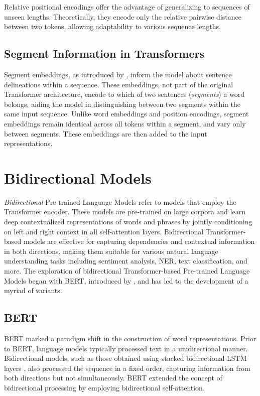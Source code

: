 Relative positional encodings offer the advantage of generalizing to sequences of unseen lengths. Theoretically, they encode only the relative pairwise distance between two tokens, allowing adaptability to various sequence lengths.

\subsection{Segment Information in Transformers}

Segment embeddings, as introduced by \citet{devlin2018bert}, inform the model about sentence delineations within a sequence. These embeddings, not part of the original Transformer architecture, encode to which of two sentences (\textit{segments})
a word belongs, aiding the model in distinguishing between two segments within the same input sequence. 
Unlike word embeddings and position encodings, segment embeddings remain identical across all tokens within a segment, and vary only between segments. These embeddings are then added to the input representations.

\section{Bidirectional Models}

\textit{Bidirectional} Pre-trained Language Models refer to models that employ the Transformer encoder. These models are pre-trained on large corpora and learn deep contextualized representations of words and phrases by jointly conditioning on left and right context in all self-attention layers. Bidirectional Transformer-based models are effective for capturing dependencies and contextual information in both directions, making them suitable for various natural language understanding tasks including sentiment analysis, \ac{NER}, text classification, and more. The exploration of bidirectional Transformer-based Pre-trained Language Models began with \ac{BERT}, introduced by \citet{devlin2018bert}, and has led to the development of a myriad of variants.

\subsection{BERT}
\label{section:related-pretrained-language-models-bert}

\ac{BERT} marked a paradigm shift in the construction of word representations.  
Prior to \ac{BERT}, language models typically processed text in a unidirectional manner. Bidirectional models, such as those obtained using stacked bidirectional \ac{LSTM} layers \citep{peters-etal-2018-deep}, also processed the sequence in a fixed order, capturing information from both directions but not simultaneously. \ac{BERT} extended the concept of bidirectional processing by employing bidirectional self-attention.

